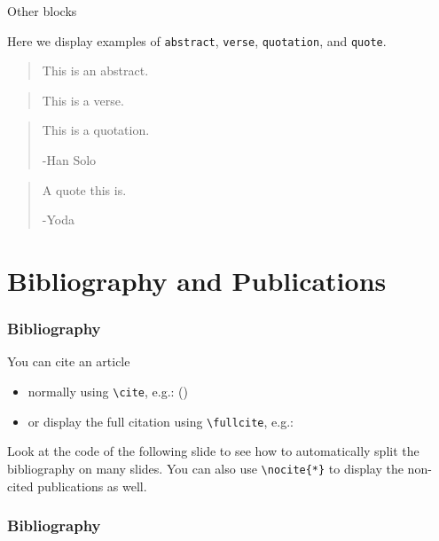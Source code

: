 \documentclass[usenames,dvipsnames,]{beamer}
\begin{document}
\begin{frame}{Other blocks}

Here we display examples of \texttt{abstract}, \texttt{verse}, \texttt{quotation}, and \texttt{quote}.

\vskip 0.5cm

\begin{abstract}
This is an abstract.
\end{abstract}
\begin{verse}
This is a verse.
\end{verse}
\begin{quotation}
This is a quotation.

\raggedleft -Han Solo
\end{quotation}
\begin{quote}
A quote this is.

\raggedleft -Yoda
\end{quote}

\end{frame}

\section{Bibliography and Publications}
\begin{frame}[fragile]
\frametitle{Bibliography}

You can cite an article
\begin{itemize}
\item normally using \texttt{\textbackslash cite}, e.g.: (\cite{article1})
\item or display the full citation using \texttt{\textbackslash fullcite}, e.g.:  
\end{itemize}

\vskip 0.5cm
Look at the code of the following slide to see how to automatically split the bibliography on many slides. You can also use \texttt{\textbackslash nocite\{*\}} to display the non-cited publications as well.

\end{frame}

\begin{frame}[t,allowframebreaks]
\frametitle{Bibliography}

\nocite{*} %

\printbibliography

\end{frame}
\end{document}

